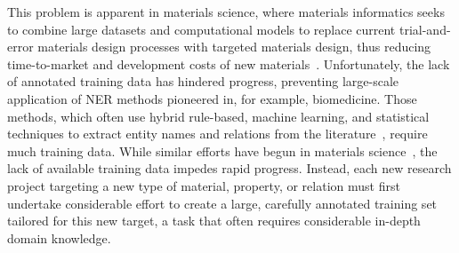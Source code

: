
This problem is apparent in materials science, where materials informatics 
seeks to combine large datasets and computational models to 
replace current trial-and-error materials design processes with targeted materials design, 
thus reducing time-to-market and development costs of new materials~\cite{MGI2014}.
Unfortunately, the lack of annotated training data has hindered progress,
preventing large-scale application of NER methods pioneered in, for example,
biomedicine.
Those methods, which often use hybrid rule-based, machine learning, and statistical techniques to extract entity names and relations from the literature~\cite{leaman2008banner,zeng2015survey}, require much training data.
While similar efforts have begun in materials science~\cite{hawizy2011chemicaltagger,rocktaschel2012chemspot,leaman2015tmchem,swain2016chemdataextractor,young2018data}, the lack of available training data impedes rapid progress. 
Instead, each new research project targeting a new type of material, property, or relation must first undertake considerable
effort to create a large, carefully annotated training
set tailored for this new target, a task that often requires considerable in-depth domain knowledge.


